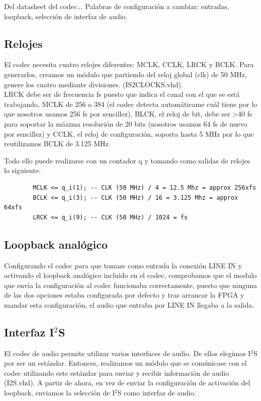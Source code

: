Del datasheet del codec... Palabras de configuración a cambiar: entradas, loopback, selección de interfaz de audio.


	\subsection{Relojes}

		El codec necesita cuatro relojes diferentes: MCLK, CCLK, LRCK y BCLK. Para generarlos, creamos un módulo que partiendo del reloj global (clk) de 50 MHz, genere los cuatro mediante divisiones. (IS2CLOCKS.vhd).\\

		LRCK debe ser de frecuencia fs puesto que indica el canal con el que se está trabajando, MCLK de 256 o 384 (el codec detecta automáticame cuál tiene por lo que nosotros usamos 256 fs por sencillez), BLCK, el reloj de bit, debe ser >40 fs para soportar la máxima resolución de 20 bits (nosotros usamos 64 fs de nuevo por sencillez) y CCLK, el reloj de configuración, soporta hasta 5 MHz por lo que reutilizamos BCLK de 3.125 MHz.

		Todo ello puede realizarse con un contador q y tomando como salidas de relojes lo siguiente:

		\begin{verbatim}
		MCLK <= q_i(1); -- CLK (50 MHz) / 4 = 12.5 Mhz = approx 256xfs
		BCLK <= q_i(3); -- CLK (50 MHz) / 16 = 3.125 Mhz = approx 64xfs
		LRCK <= q_i(9); -- CLK (50 MHz) / 1024 = fs
		\end{verbatim} 
	

	\subsection{Loopback analógico}

		Configurando el codec para que tomase como entrada la conexión LINE IN y activando el loopback analógico incluido en el codec, comprobamos que el modulo que envía la configuración al codec funcionaba correctamente, puesto que ninguna de las dos opciones estaba configurada por defecto y tras arrancar la FPGA y mandar esta configuración, el audio que entraba por LINE IN llegaba a la salida.
		
	
	\subsection{Interfaz I$^2$S}

		El codec de audio permite utilizar varios interfaces de audio. De ellos elegimos I$^2$S por ser un estándar. Entonces, realizamos un módulo que se comúnicase con el codec utilizando este estándar para enviar y recibir información de audio (I2S.vhd). A partir de ahora, en vez de enviar la configuración de activación del loopback, enviamos la selección de I$^2$S como interfaz de audio.

